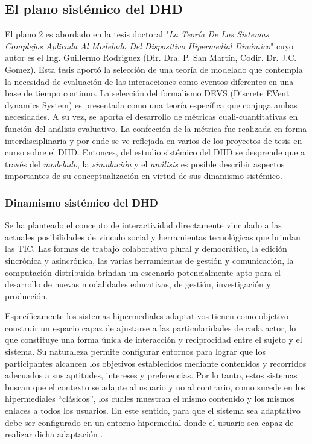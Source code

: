 \subsection{El plano sistémico del DHD}

El plano 2 es abordado en la tesis doctoral "\textit{La Teoría De Los Sistemas
Complejos Aplicada Al Modelado Del Dispositivo Hipermedial Dinámico}" cuyo autor es el Ing. Guillermo Rodriguez (Dir. Dra. P. San Martín, Codir. Dr. J.C. Gomez). Esta tesis aportó la selección de una teoría de
modelado que contempla la necesidad de evaluación de las interacciones como
eventos diferentes en una base de tiempo continuo. La selección del formalismo
DEVS (Discrete EVent dynamics System) es presentada como una teoría específica que
conjuga ambas necesidades. A su vez, se aporta el desarrollo de
métricas cuali-cuantitativas en función del análisis evaluativo. La confección de la métrica
fue realizada en forma interdisciplinaria y por ende se ve reflejada en varios de los proyectos de tesis en curso sobre el DHD. Entonces, del estudio sistémico del DHD se desprende que a través del
\textit{modelado}, la \textit{simulación} y el \textit{análisis} es  posible
describir aspectos importantes de su conceptualización en virtud de sus
dinamismo sistémico.


\subsubsection{Dinamismo sistémico del DHD}

Se ha planteado el concepto de interactividad directamente vinculado a las
actuales posibilidades de 
vinculo social y herramientas tecnológicas que brindan las TIC.
Las formas de trabajo colaborativo plural y democrático, la edición sincrónica y
asincrónica, las varias herramientas de gestión y comunicación, la computación
distribuida brindan un escenario potencialmente apto para el desarrollo de
nuevas modalidades educativas, de gestión, investigación y producción.


Específicamente los sistemas hipermediales adaptativos tienen como
objetivo construir un espacio capaz de ajustarse a las particularidades de cada
actor, lo que constituye una forma única de interacción y reciprocidad
entre el sujeto y el sistema. Su naturaleza permite configurar entornos para lograr que
los participantes alcancen los objetivos establecidos mediante contenidos y
recorridos adecuados a sus aptitudes, intereses y preferencias.
Por lo tanto, estos sistemas buscan que el contexto se adapte al usuario y
no al contrario, como sucede en los hipermediales “clásicos”, los cuales
muestran el mismo contenido y los mismos enlaces a todos los usuarios. En
este sentido, para que el sistema sea adaptativo debe ser configurado en un entorno
hipermedial donde el usuario sea capaz de realizar dicha
adaptación \cite{lxxviii}.
 
